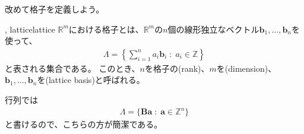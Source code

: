 改めて格子を定義しよう。

\begin{Defi}{, lattice}{lattice}
$\mathbb{R}^m$における格子とは、$\mathbb{R}^m$の$n$個の線形独立なベクトル$\mathbf{b}_1, \ldots,\mathbf{b}_n$を使って、
\begin{align*}
\Lambda = \left\{ \sum_{i=1}^n a_i \mathbf{b}_i \; : \; a_i \in\mathbb{Z} \right\}
\end{align*}
と表される集合である。
このとき、$n$を格子の(rank)、$m$を(dimension)、$\mathbf{b}_1, \ldots,\mathbf{b}_n$を(lattice basis)と呼ばれる。
\end{Defi}

行列では
\begin{align*}
\Lambda = \{ \mathbf{Ba} \; : \; \mathbf{a} \in \mathbb{Z}^n\}
\end{align*}
と書けるので、こちらの方が簡潔である。

